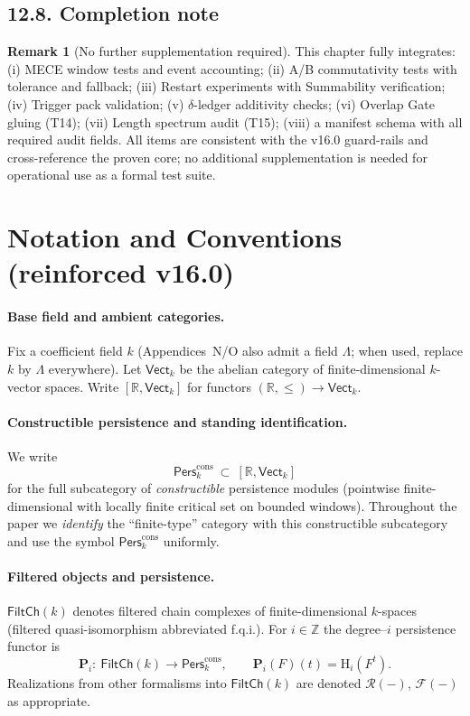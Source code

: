\documentclass[11pt]{article}
\numberwithin{equation}{section}
\theoremstyle{plain}
\theoremstyle{definition}
\theoremstyle{remark}
\DeclareRobustCommand{\hyp}{\nobreakdash-}
\newcommand{\Pers}{\mathsf{Pers}}
\theoremstyle{plain}
\theoremstyle{definition}
\numberwithin{equation}{section}
\theoremstyle{definition}
\newtheorem{remark}[theorem]{Remark}
\DeclareRobustCommand{\Perskft}{\Pers^{\mathrm{cons}}_{k}}
\numberwithin{equation}{section}
\theoremstyle{plain}
\theoremstyle{definition}
\theoremstyle{remark}
\begin{document}
\subsection*{12.8. Completion note}
\begin{remark}[No further supplementation required]
This chapter fully integrates: (i) MECE window tests and event accounting; (ii) A/B commutativity tests with tolerance and fallback; (iii) Restart experiments with Summability verification; (iv) Trigger pack validation; (v) $\delta$-ledger additivity checks; (vi) Overlap Gate gluing (T14); (vii) Length spectrum audit (T15); (viii) a manifest schema with all required audit fields. All items are consistent with the v16.0 guard\hyp rails and cross\hyp reference the proven core; no additional supplementation is needed for operational use as a formal test suite.
\end{remark}



\section*{Notation and Conventions (reinforced v16.0)}
{}

\paragraph{Base field and ambient categories.}
Fix a coefficient field \(k\) (Appendices~N/O also admit a field \(\Lambda\); when used, replace \(k\) by \(\Lambda\) everywhere).
Let \(\mathsf{Vect}_k\) be the abelian category of finite\hyp dimensional \(k\)\hyp vector spaces.
Write \([\mathbb{R},\mathsf{Vect}_k]\) for functors \((\mathbb{R},\le)\to \mathsf{Vect}_k\).

\paragraph{Constructible persistence and standing identification.}
We write
\[
\Perskft\ \subset\ [\mathbb{R},\mathsf{Vect}_k]
\]
for the full subcategory of \emph{constructible} persistence modules (pointwise finite\hyp dimensional with locally finite critical set on bounded windows).
Throughout the paper we \emph{identify} the “finite\hyp type” category with this constructible subcategory and use the symbol \(\Perskft\) uniformly.

\paragraph{Filtered objects and persistence.}
\(\mathsf{FiltCh}(k)\) denotes filtered chain complexes of finite\hyp dimensional \(k\)\hyp spaces (filtered quasi\hyp isomorphism abbreviated f.q.i.).
For \(i\in\mathbb{Z}\) the degree–\(i\) persistence functor is
\[
\mathbf{P}_i:\ \mathsf{FiltCh}(k)\longrightarrow \Perskft,\qquad \mathbf{P}_i(F)(t)=\mathrm{H}_i(F^t).
\]
Realizations from other formalisms into \(\mathsf{FiltCh}(k)\) are denoted \(\mathcal{R}(-)\), \(\mathcal{F}(-)\) as appropriate.
\end{document}
